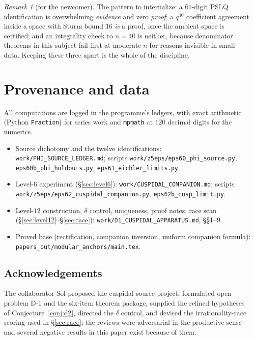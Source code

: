 \documentclass[11pt,reqno]{amsart}
\theoremstyle{plain}
\theoremstyle{definition}
\theoremstyle{remark}
\newtheorem{remark}[theorem]{Remark}
\begin{document}
\begin{remark}[for the newcomer]
The pattern to internalize: a $61$-digit PSLQ identification is
overwhelming \emph{evidence} and zero \emph{proof}; a $q^{40}$ coefficient
agreement inside a space with Sturm bound $16$ \emph{is} a proof, once the
ambient space is certified; and an integrality check to $n=40$ is neither,
because denominator theorems in this subject fail first at moderate $n$ for
reasons invisible in small data. Keeping these three apart is the whole of
the discipline.
\end{remark}

\section{Provenance and data}\label{sec:prov}

All computations are logged in the programme's ledgers, with exact
arithmetic (Python \texttt{Fraction}) for series work and \texttt{mpmath}
at $120$ decimal digits for the numerics.

\begin{sloppypar}
\begin{itemize}[leftmargin=1.6em]
\item Source dichotomy and the twelve identifications:
\texttt{work/PHI\_SOURCE\_LEDGER.md}; scripts
\texttt{work/z5eps/eps60\_phi\_source.py},
\texttt{eps60b\_phi\_holdouts.py}, \texttt{eps61\_eichler\_limits.py}.
\item Level-$6$ experiment (\S\ref{sec:level6}):
\texttt{work/CUSPIDAL\_COMPANION.md}; scripts
\texttt{work/z5eps/eps62\_cuspidal\_companion.py},
\texttt{eps62b\_cusp\_limit.py}.
\item Level-$12$ construction, $\delta$ control, uniqueness, proof notes,
race scan (\S\ref{sec:level12}--\S\ref{sec:race}):
\texttt{work/D1\_CUSPIDAL\_APPARATUS.md}, \S\S1--9.
\item Proved base (rectification, companion inversion, uniform companion
formula): \texttt{papers\_out/modular\_anchors/main.tex}.
\end{itemize}
\end{sloppypar}

\subsection*{Acknowledgements}
The collaborator Sol proposed the cuspidal-source project, formulated open
problem D-1 and the six-item theorem package, supplied the refined
hypotheses of Conjecture~\ref{conj:d2}, directed the $\delta$ control, and
devised the irrationality-race scoring used in \S\ref{sec:race}; the
reviews were adversarial in the productive sense and several negative
results in this paper exist because of them.
\end{document}
